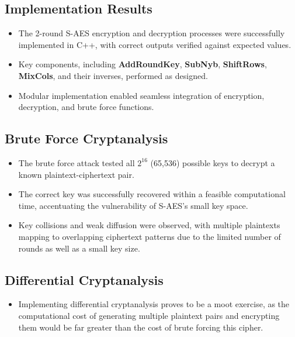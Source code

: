 \documentclass{article}
\begin{document}
\subsection{Implementation Results}
\begin{itemize}
    \item The 2-round S-AES encryption and decryption processes were successfully implemented in C++, with correct outputs verified against expected values.
    
    \item Key components, including \textbf{AddRoundKey}, \textbf{SubNyb}, \textbf{ShiftRows}, \textbf{MixCols}, and their inverses, performed as designed.
    
    \item Modular implementation enabled seamless integration of encryption, decryption, and brute force functions.
\end{itemize}

\subsection{Brute Force Cryptanalysis}
\begin{itemize}
    \item The brute force attack tested all \(2^{16}\) (65,536) possible keys to decrypt a known plaintext-ciphertext pair.
    
    \item The correct key was successfully recovered within a feasible computational time, accentuating the vulnerability of S-AES's small key space. 
    
    \item Key collisions and weak diffusion were observed, with multiple plaintexts mapping to overlapping ciphertext patterns due to the limited number of rounds as well as a small key size.
\end{itemize}

\subsection{Differential Cryptanalysis}
\begin{itemize}
    \item Implementing differential cryptanalysis proves to be a moot exercise, as the computational cost of generating multiple plaintext pairs and encrypting them would be far greater than the cost of brute forcing this cipher.
\end{itemize}
\end{document}
